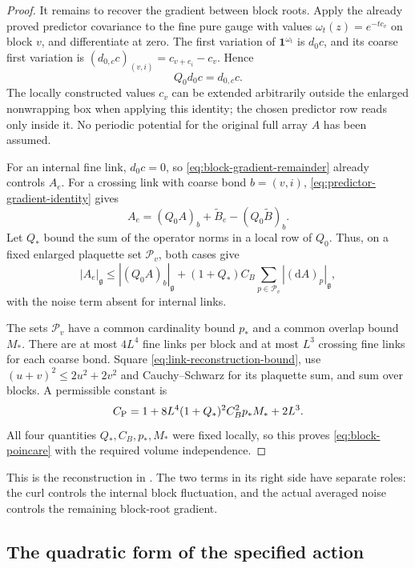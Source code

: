 \documentclass[11pt,reqno]{amsart}
\numberwithin{equation}{section}
\theoremstyle{definition}
\theoremstyle{remark}
\newcommand{\dd}{\mathrm d}
\newcommand{\g}{\mathfrak g}
\begin{document}
\begin{proof}
It remains to recover the gradient between block roots.
Apply the already proved predictor covariance to the fine pure
gauge with values \(\omega_t(z)=e^{-tc_v}\) on block \(v\),
and differentiate at zero. The first variation of
\(\mathbf1^{\omega_t}\) is \(d_0c\), and its coarse first
variation is \((d_{0,c}c)_{(v,i)}=c_{v+e_i}-c_v\). Hence
\begin{equation}
                           Q_0d_0c=d_{0,c}c.
 \label{eq:predictor-gradient-identity}
\end{equation}
The locally constructed values \(c_v\) can be extended arbitrarily
outside the enlarged nonwrapping box when applying this identity;
the chosen predictor row reads only inside it. No periodic
potential for the original full array \(A\) has been assumed.

For an internal fine link, \(d_0c=0\), so
\eqref{eq:block-gradient-remainder} already controls \(A_e\).
For a crossing link with coarse bond \(b=(v,i)\),
\eqref{eq:predictor-gradient-identity} gives
\[
       A_e=(Q_0A)_b+\widetilde B_e-(Q_0\widetilde B)_b.
\]
Let \(Q_*\) bound the sum of the operator norms in a local row
of \(Q_0\). Thus, on a fixed enlarged plaquette set
\(\mathcal P_v\), both cases give
\begin{equation}
       |A_e|_{\g}\le |(Q_0A)_b|_{\g}
                 +(1+Q_*)C_B\sum_{p\in\mathcal P_v}|(\dd A)_p|_{\g},
 \label{eq:link-reconstruction-bound}
\end{equation}
with the noise term absent for internal links.

The sets \(\mathcal P_v\) have a common cardinality bound \(p_*\)
and a common overlap bound \(M_*\). There are at most \(4L^4\)
fine links per block and at most \(L^3\) crossing fine links for
each coarse bond. Square \eqref{eq:link-reconstruction-bound},
use \((u+v)^2\le2u^2+2v^2\) and Cauchy--Schwarz for its
plaquette sum, and sum over blocks. A permissible constant is
\[
       C_{\rm P}=1+8L^4(1+Q_*)^2C_B^2p_*M_*+2L^3.
\]
All four quantities \(Q_*,C_B,p_*,M_*\) were fixed locally,
so this proves \eqref{eq:block-poincare} with the required
volume independence.
\end{proof}

This is the reconstruction in
\cite[Lemma~14.11, (14.20)--(14.23), pp.~65--66]{Main}.
The two terms in its right side have separate roles: the curl
controls the internal block fluctuation, and the actual averaged
noise controls the remaining block-root gradient.

\subsection{The quadratic form of the specified action}
\end{document}
